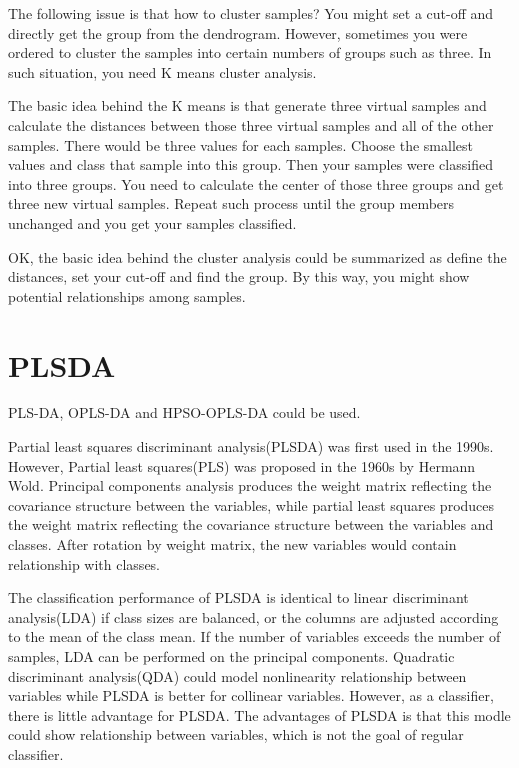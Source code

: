 \documentclass[
]{book}
\begin{document}
The following issue is that how to cluster samples? You might set a cut-off and directly get the group from the dendrogram. However, sometimes you were ordered to cluster the samples into certain numbers of groups such as three. In such situation, you need K means cluster analysis.

The basic idea behind the K means is that generate three virtual samples and calculate the distances between those three virtual samples and all of the other samples. There would be three values for each samples. Choose the smallest values and class that sample into this group. Then your samples were classified into three groups. You need to calculate the center of those three groups and get three new virtual samples. Repeat such process until the group members unchanged and you get your samples classified.

OK, the basic idea behind the cluster analysis could be summarized as define the distances, set your cut-off and find the group. By this way, you might show potential relationships among samples.

\hypertarget{plsda}{%
\section{PLSDA}\label{plsda}}

PLS-DA, OPLS-DA and HPSO-OPLS-DA\citep{yang2017a} could be used.

Partial least squares discriminant analysis(PLSDA) was first used in the 1990s. However, Partial least squares(PLS) was proposed in the 1960s by Hermann Wold. Principal components analysis produces the weight matrix reflecting the covariance structure between the variables, while partial least squares produces the weight matrix reflecting the covariance structure between the variables and classes. After rotation by weight matrix, the new variables would contain relationship with classes.

The classification performance of PLSDA is identical to linear discriminant analysis(LDA) if class sizes are balanced, or the columns are adjusted according to the mean of the class mean. If the number of variables exceeds the number of samples, LDA can be performed on the principal components. Quadratic discriminant analysis(QDA) could model nonlinearity relationship between variables while PLSDA is better for collinear variables. However, as a classifier, there is little advantage for PLSDA. The advantages of PLSDA is that this modle could show relationship between variables, which is not the goal of regular classifier.
\end{document}

